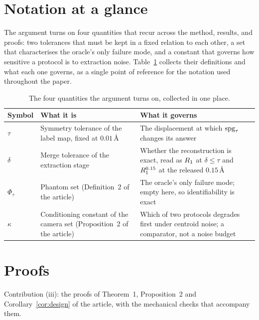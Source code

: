 
\section{Notation at a glance}
\label{app:glance}
The argument turns on four quantities that recur across the method, results, and proofs: two tolerances that
must be kept in a fixed relation to each other, a set that characterises the oracle's only failure mode, and a
constant that governs how sensitive a protocol is to extraction noise. Table~\ref{tab:glance} collects their
definitions and what each one governs, as a single point of reference for the notation used throughout the
paper.

\begin{table}[htbp]
\centering
\caption{The four quantities the argument turns on, collected in one place.}
\label{tab:glance}
\small
\begin{tabular*}{\textwidth}{@{\extracolsep{\fill}}>{\raggedright\arraybackslash}p{}>{\raggedright\arraybackslash}p{}>{\raggedright\arraybackslash}p{}@{}}
\toprule
Symbol & What it is & What it governs \\
\midrule
$\tau$ & Symmetry tolerance of the label map, fixed at $0.01$\,\AA{} & The displacement at which $\mathrm{spg}_\tau$ changes its answer \\
$\delta$ & Merge tolerance of the extraction stage & Whether the reconstruction is exact, read as $R_1$ at $\delta \le \tau$ and $R_1^{0.15}$ at the released $0.15$\,\AA{} \\
$\Phi_\tau$ & Phantom set (Definition~2 of the article) & The oracle's only failure mode; empty here, so identifiability is exact \\
$\kappa$ & Conditioning constant of the camera set (Proposition~2 of the article) & Which of two protocols degrades first under centroid noise; a comparator, not a noise budget \\
\bottomrule
\end{tabular*}
\end{table}

\section{Proofs}
\label{app:proof}
Contribution (iii): the proofs of Theorem~1, Proposition~2 and Corollary~\ref{cor:design} of the article, with the mechanical checks that accompany them.


